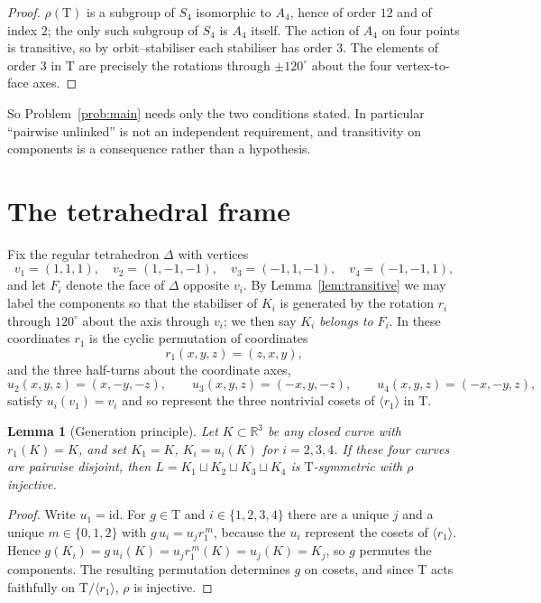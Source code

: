 \documentclass[11pt,a4paper]{article}
\theoremstyle{plain}
\newtheorem{lemma}[theorem]{Lemma}
\theoremstyle{definition}
\newcommand{\RR}{\mathbb{R}}
\newcommand{\Tet}{\mathrm{T}}
\begin{document}
\begin{proof}
$\rho(\Tet)$ is a subgroup of $S_4$ isomorphic to $A_4$, hence of order $12$ and
of index $2$; the only such subgroup of $S_4$ is $A_4$ itself. The action of
$A_4$ on four points is transitive, so by orbit--stabiliser each stabiliser has
order $3$. The elements of order $3$ in $\Tet$ are precisely the rotations
through $\pm120^\circ$ about the four vertex-to-face axes.
\end{proof}

So Problem~\ref{prob:main} needs only the two conditions stated. In particular
``pairwise unlinked'' is not an independent requirement, and transitivity on
components is a consequence rather than a hypothesis.

\section{The tetrahedral frame}\label{sec:frame}

Fix the regular tetrahedron $\Delta$ with vertices
\[
  v_1=(1,1,1),\quad v_2=(1,-1,-1),\quad v_3=(-1,1,-1),\quad v_4=(-1,-1,1),
\]
and let $F_i$ denote the face of $\Delta$ opposite $v_i$. By
Lemma~\ref{lem:transitive} we may label the components so that the stabiliser of
$K_i$ is generated by the rotation $r_i$ through $120^\circ$ about the axis
through $v_i$; we then say $K_i$ \emph{belongs to} $F_i$. In these coordinates
$r_1$ is the cyclic permutation of coordinates
\begin{equation}\label{eq:r1}
  r_1(x,y,z)=(z,x,y),
\end{equation}
and the three half-turns about the coordinate axes,
\begin{equation}\label{eq:halfturns}
  u_2(x,y,z)=(x,-y,-z),\qquad u_3(x,y,z)=(-x,y,-z),\qquad u_4(x,y,z)=(-x,-y,z),
\end{equation}
satisfy $u_i(v_1)=v_i$ and so represent the three nontrivial cosets of
$\langle r_1\rangle$ in $\Tet$.

\begin{lemma}[Generation principle]\label{lem:generate}
Let $K\subset\RR^3$ be any closed curve with $r_1(K)=K$, and set $K_1=K$,
$K_i=u_i(K)$ for $i=2,3,4$. If these four curves are pairwise disjoint, then
$L=K_1\sqcup K_2\sqcup K_3\sqcup K_4$ is $\Tet$-symmetric with $\rho$ injective.
\end{lemma}

\begin{proof}
Write $u_1=\mathrm{id}$. For $g\in\Tet$ and $i\in\{1,2,3,4\}$ there are a unique
$j$ and a unique $m\in\{0,1,2\}$ with $g\,u_i=u_j r_1^{\,m}$, because the $u_i$
represent the cosets of $\langle r_1\rangle$. Hence
$g(K_i)=g\,u_i(K)=u_j r_1^{\,m}(K)=u_j(K)=K_j$, so $g$ permutes the components.
The resulting permutation determines $g$ on cosets, and since $\Tet$ acts
faithfully on $\Tet/\langle r_1\rangle$, $\rho$ is injective.
\end{proof}
\end{document}
